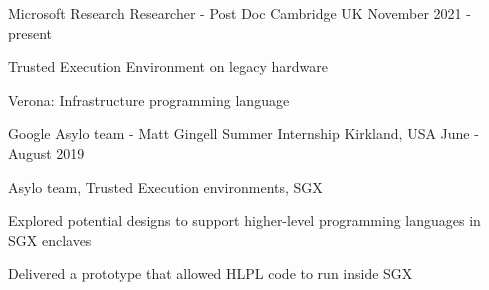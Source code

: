 


\begin{cventries}

\cventry
{Microsoft Research}
{Researcher - Post Doc}
{Cambridge UK}
{November 2021 - present}
{
  \begin{cvitems}
  \item{Trusted Execution Environment on legacy hardware}
  \item{Verona: Infrastructure programming language}
  \end{cvitems}
}

\cventry
{Google Asylo team - Matt Gingell}
{Summer Internship}
{Kirkland, USA}
{June - August 2019}
{ 
  \begin{cvitems}
  \item{Asylo team, Trusted Execution environments, SGX}
	\item{Explored potential designs to support higher-level programming languages in SGX enclaves}
  \item{Delivered a prototype that allowed HLPL code to run inside SGX}
	\end{cvitems}
}

\end{cventries}
